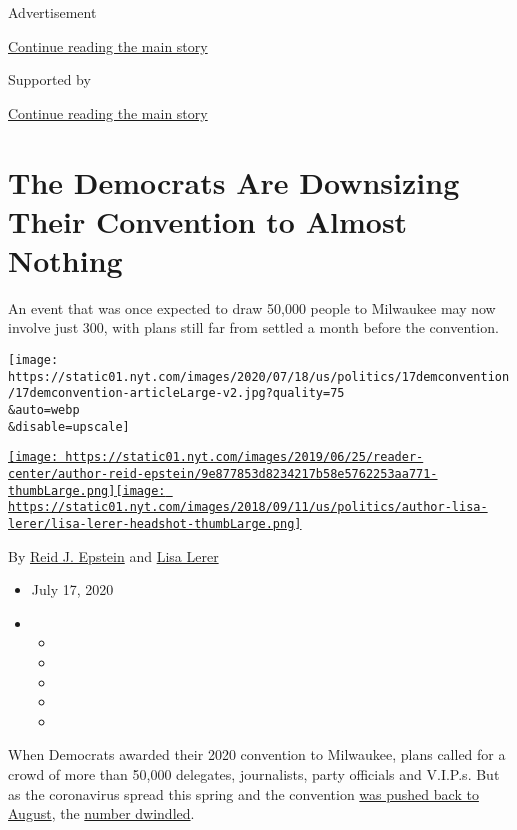 Advertisement

\protect\hyperlink{after-top}{Continue reading the main story}

Supported by

\protect\hyperlink{after-sponsor}{Continue reading the main story}

\hypertarget{the-democrats-are-downsizing-their-convention-to-almost-nothing}{%
\section{The Democrats Are Downsizing Their Convention to Almost
Nothing}\label{the-democrats-are-downsizing-their-convention-to-almost-nothing}}

An event that was once expected to draw 50,000 people to Milwaukee may
now involve just 300, with plans still far from settled a month before
the convention.

\texttt{[image: https://static01.nyt.com/images/2020/07/18/us/politics/17demconvention/17demconvention-articleLarge-v2.jpg?quality=75\\\&auto=webp\\\&disable=upscale]}

\href{https://www.nytimes.com/by/reid-j-epstein}{\texttt{[image: https://static01.nyt.com/images/2019/06/25/reader-center/author-reid-epstein/9e877853d8234217b58e5762253aa771-thumbLarge.png]}}\href{https://www.nytimes.com/by/lisa-lerer}{\texttt{[image: https://static01.nyt.com/images/2018/09/11/us/politics/author-lisa-lerer/lisa-lerer-headshot-thumbLarge.png]}}

By \href{https://www.nytimes.com/by/reid-j-epstein}{Reid J. Epstein} and
\href{https://www.nytimes.com/by/lisa-lerer}{Lisa Lerer}

\begin{itemize}
\item
  July 17, 2020
\item
  \begin{itemize}
  \item
  \item
  \item
  \item
  \item
  \end{itemize}
\end{itemize}

When Democrats awarded their 2020 convention to Milwaukee, plans called
for a crowd of more than 50,000 delegates, journalists, party officials
and V.I.P.s. But as the coronavirus spread this spring and the
convention
\href{https://www.nytimes.com/2020/04/02/us/politics/milwaukee-democratic-convention-delayed.html}{was
pushed back to August}, the
\href{https://www.nytimes.com/2020/06/24/us/politics/democratic-convention-milwaukee-coronavirus.html}{number
dwindled}.

